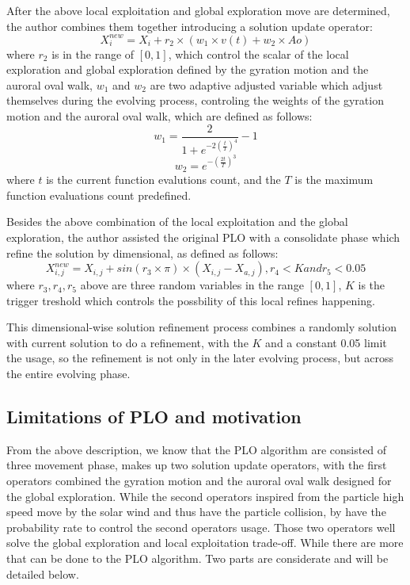 \documentclass[review]{elsarticle}
\begin{document}
After the above local exploitation and global exploration move are determined, the author combines them together introducing a solution update operator:
\begin{equation}
X^{new}_i = X_i + r_2 \times (w_1 \times v(t) + w_2 \times Ao)
\end{equation}
where $r_2$ is in the range of $[0, 1]$, which control the scalar of the local exploration and global exploration defined by the gyration motion and the auroral oval walk, $w_1$ and $w_2$ are two adaptive adjusted variable which adjust themselves during the evolving process, controling the weights of the gyration motion and the auroral oval walk, which are defined as follows:
\begin{equation}
w_1 = \frac{2}{1+e^{-2 (\frac{t}{T})^4}} -1
\end{equation}
\begin{equation}
w_2 = e^{- (\frac{2t}{T})^3}
\end{equation}
where $t$ is the current function evalutions count, and the $T$ is the maximum function evaluations count predefined.

Besides the above combination of the local exploitation and the global exploration, the author assisted the original PLO with a consolidate phase which refine the solution by dimensional, as defined as follows:
\begin{equation}
X^{new}_{i, j} = X_{i, j} + sin(r_3 \times \pi) \times (X_{i, j} - X_{a, j}), r_4 < K and r_5 <0.05
\end{equation}
where $r_3, r_4, r_5$ above are three random variables in the range $[0, 1]$, $K$ is the trigger treshold which controls the possbility of this local refines happening.

This dimensional-wise solution refinement process combines a randomly solution with current solution to do a refinement, with the $K$ and a constant 0.05 limit the usage, so the refinement is not only in the later evolving process, but across the entire evolving phase.

\subsection{Limitations of PLO and motivation}
From the above description, we know that the PLO algorithm are consisted of three movement phase, makes up two solution update operators, with the first operators combined the gyration motion and the auroral oval walk  designed for the global exploration. While the second operators inspired from the particle high speed move by the solar wind and thus have the particle collision, by have the probability rate to control the second operators usage. Those two operators well solve the global exploration and local exploitation trade-off. While there are more that can be done to the PLO algorithm. Two parts are considerate and will be detailed below.
\end{document}
